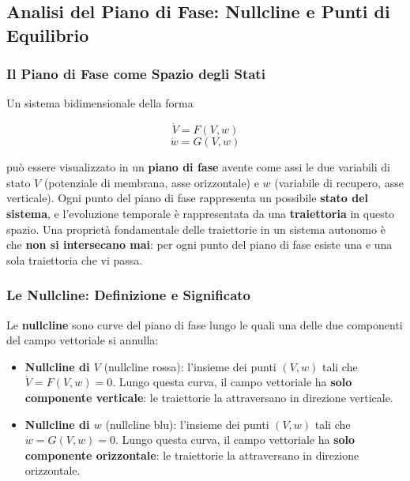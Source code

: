 \subsection{Analisi del Piano di Fase: Nullcline e Punti di Equilibrio}

\subsubsection{Il Piano di Fase come Spazio degli Stati}

Un sistema bidimensionale della forma

\begin{equation}
\dot{V} = F(V, w)
\end{equation}
\begin{equation}
\dot{w} = G(V, w)
\end{equation}

può essere visualizzato in un \textbf{piano di fase} avente come assi le due variabili di stato $V$ (potenziale di membrana, asse orizzontale) e $w$ (variabile di recupero, asse verticale). Ogni punto del piano di fase rappresenta un possibile \textbf{stato del sistema}, e l'evoluzione temporale è rappresentata da una \textbf{traiettoria} in questo spazio. Una proprietà fondamentale delle traiettorie in un sistema autonomo è che \textbf{non si intersecano mai}: per ogni punto del piano di fase esiste una e una sola traiettoria che vi passa.

\subsubsection{Le Nullcline: Definizione e Significato}

Le \textbf{nullcline} sono curve del piano di fase lungo le quali una delle due componenti del campo vettoriale si annulla:

\begin{itemize}
    \item \textbf{Nullcline di $V$} (nullcline rossa): l'insieme dei punti $(V, w)$ tali che $\dot{V} = F(V, w) = 0$.
    Lungo questa curva, il campo vettoriale ha \textbf{solo componente verticale}: le traiettorie la attraversano in direzione verticale.
    \item \textbf{Nullcline di $w$} (nullcline blu): l'insieme dei punti $(V, w)$ tali che $\dot{w} = G(V, w) = 0$.
    Lungo questa curva, il campo vettoriale ha \textbf{solo componente orizzontale}: le traiettorie la attraversano in direzione orizzontale.
\end{itemize}

